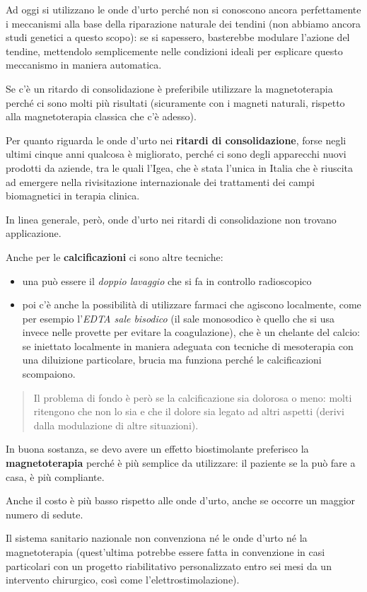 \documentclass[]{article}
\begin{document}
Ad oggi si utilizzano le onde d'urto perché non si conoscono ancora
perfettamente i meccanismi alla base della riparazione naturale dei
tendini (non abbiamo ancora studi genetici a questo scopo): se si
sapessero, basterebbe modulare l'azione del tendine, mettendolo
semplicemente nelle condizioni ideali per esplicare questo meccanismo in
maniera automatica.

Se c'è un ritardo di consolidazione è preferibile utilizzare la
magnetoterapia perché ci sono molti più risultati (sicuramente con i
magneti naturali, rispetto alla magnetoterapia classica che c'è adesso).

Per quanto riguarda le onde d'urto nei \textbf{ritardi di
consolidazione}, forse negli ultimi cinque anni qualcosa è migliorato,
perché ci sono degli apparecchi nuovi prodotti da aziende, tra le quali
l'Igea, che è stata l'unica in Italia che è riuscita ad emergere nella
rivisitazione internazionale dei trattamenti dei campi biomagnetici in
terapia clinica.

In linea generale, però, onde d'urto nei ritardi di consolidazione non
trovano applicazione.

Anche per le \textbf{calcificazioni} ci sono altre tecniche:

\begin{itemize}
\item
  una può essere il \emph{doppio lavaggio} che si fa in controllo
  radioscopico
\item
  poi c'è anche la possibilità di utilizzare farmaci che agiscono
  localmente, come per esempio l'\emph{EDTA sale bisodico} (il sale
  monosodico è quello che si usa invece nelle provette per evitare la
  coagulazione), che è un chelante del calcio: se iniettato localmente
  in maniera adeguata con tecniche di mesoterapia con una diluizione
  particolare, brucia ma funziona perché le calcificazioni scompaiono.
\end{itemize}

\begin{quote}
Il problema di fondo è però se la calcificazione sia dolorosa o meno:
molti ritengono che non lo sia e che il dolore sia legato ad altri
aspetti (derivi dalla modulazione di altre situazioni).
\end{quote}

In buona sostanza, se devo avere un effetto biostimolante preferisco la
\textbf{magnetoterapia} perché è più semplice da utilizzare: il paziente
se la può fare a casa, è più compliante.

Anche il costo è più basso rispetto alle onde d'urto, anche se occorre
un maggior numero di sedute.

Il sistema sanitario nazionale non convenziona né le onde d'urto né la
magnetoterapia (quest'ultima potrebbe essere fatta in convenzione in
casi particolari con un progetto riabilitativo personalizzato entro sei
mesi da un intervento chirurgico, così come l'elettrostimolazione).
\end{document}
